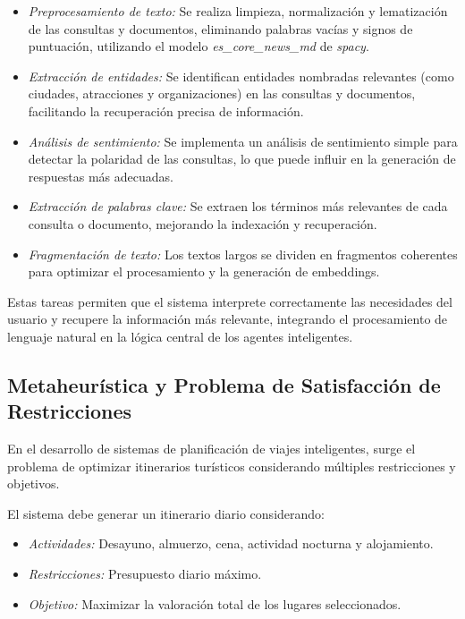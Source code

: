 \documentclass[10pt]{llncs}
\begin{document}
\begin{itemize}
    \item \textit{Preprocesamiento de texto:} Se realiza limpieza, normalización y lematización de las consultas y documentos, eliminando palabras vacías y signos de puntuación, utilizando el modelo \textit{es\_core\_news\_md} de \textit{spacy}.
    \item \textit{Extracción de entidades:} Se identifican entidades nombradas relevantes (como ciudades, atracciones y organizaciones) en las consultas y documentos, facilitando la recuperación precisa de información.
    \item \textit{Análisis de sentimiento:} Se implementa un análisis de sentimiento simple para detectar la polaridad de las consultas, lo que puede influir en la generación de respuestas más adecuadas.
    \item \textit{Extracción de palabras clave:} Se extraen los términos más relevantes de cada consulta o documento, mejorando la indexación y recuperación.
    \item \textit{Fragmentación de texto:} Los textos largos se dividen en fragmentos coherentes para optimizar el procesamiento y la generación de embeddings.
\end{itemize}

Estas tareas permiten que el sistema interprete correctamente las necesidades del usuario y recupere la información más relevante, integrando el procesamiento de lenguaje natural en la lógica central de los agentes inteligentes.

\vspace{\baselineskip}

\subsection{Metaheurística y Problema de Satisfacción de Restricciones}


En el desarrollo de sistemas de planificación de viajes inteligentes, surge el problema de optimizar itinerarios turísticos considerando múltiples restricciones y objetivos.

El sistema debe generar un itinerario diario considerando:
\begin{itemize}
    \item \textit{Actividades:} Desayuno, almuerzo, cena, actividad nocturna y alojamiento.
    \item \textit{Restricciones:} Presupuesto diario máximo.
    \item \textit{Objetivo:} Maximizar la valoración total de los lugares seleccionados.
\end{itemize}
\end{document}
